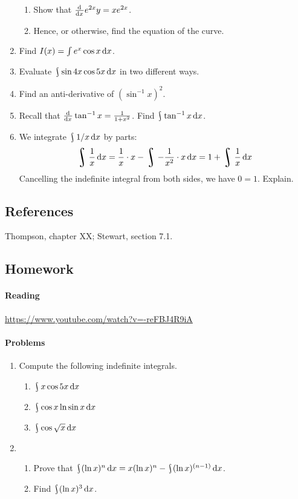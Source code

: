 \begin{enumerate}
\begin{enumerate}
          \item Show that $ \od{}{x} e^{2x} y = xe^{2x} $.
          \item Hence, or otherwise, find the equation of the curve.
        \end{enumerate}
  \item Find $ I(x) = \int e^x \cos x \dif{x} $.
  \item Evaluate $ \rint \sin 4x \cos 5x \dif{x} $ in two different ways.
  \item Find an anti-derivative of $ (\sin^{-1} x)^2 $.
  \item Recall that $ \od{}{x} \tan^{-1} x = \frac{1}{1 + x^2} $. Find $ \rint \tan^{-1} x \dif{x} $.
  \item We integrate $ \rint 1/x \dif{x} $ by parts:
        \begin{align*}
          \rint \frac{1}{x} \dif{x} = \frac{1}{x} \cdot x - \rint -\frac{1}{x^2} \cdot x \dif{x} = 1 + \rint \frac{1}{x} \dif{x}
        \end{align*}
        Cancelling the indefinite integral from both sides, we have $ 0 = 1 $. Explain.
\end{enumerate}

\subsection{References}
Thompson, chapter XX; Stewart, section 7.1.

\subsection{Homework}
\paragraph{Reading}
\url{https://www.youtube.com/watch?v=-reFBJ4R9iA}

\paragraph{Problems}
\begin{enumerate}
  \item Compute the following indefinite integrals.
    \begin{enumerate}
      \item $ \rint x \cos 5x \dif{x} $
      \item $ \rint \cos x \ln \sin x \dif{x} $
      \item $ \rint \cos \sqrt{x} \dif{x} $
    \end{enumerate}
  \item
    \begin{enumerate}
      \item Prove that $ \rint (\ln x)^n \dif{x} = x(\ln x)^n - \rint (\ln x)^{(n-1)} \dif{x} $.
      \item Find $ \rint (\ln x)^3 \dif{x} $.
    \end{enumerate}
\end{enumerate}

